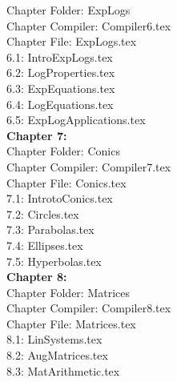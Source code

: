 \documentclass[11pt]{book}
\theoremstyle{definition}  %
\begin{document}
\begin{multicols}{2}
Chapter Folder:  ExpLogs \\

Chapter Compiler:  Compiler6.tex \\

Chapter File: ExpLogs.tex \\

6.1:  IntroExpLogs.tex \\

6.2:  LogProperties.tex \\

6.3:  ExpEquations.tex \\

6.4:  LogEquations.tex \\

6.5:  ExpLogApplications.tex \\

\textbf{Chapter 7:} \\


Chapter Folder: Conics \\

Chapter Compiler:  Compiler7.tex \\

Chapter File:  Conics.tex \\

7.1:  IntrotoConics.tex \\

7.2:  Circles.tex \\

7.3:  Parabolas.tex \\

7.4:  Ellipses.tex \\

7.5:  Hyperbolas.tex \\




\textbf{Chapter 8:} \\


Chapter Folder:  Matrices \\

Chapter Compiler:  Compiler8.tex \\

Chapter File:  Matrices.tex \\

8.1:  LinSystems.tex \\

8.2:  AugMatrices.tex \\

8.3:  MatArithmetic.tex \\


\end{multicols}
\end{document}
